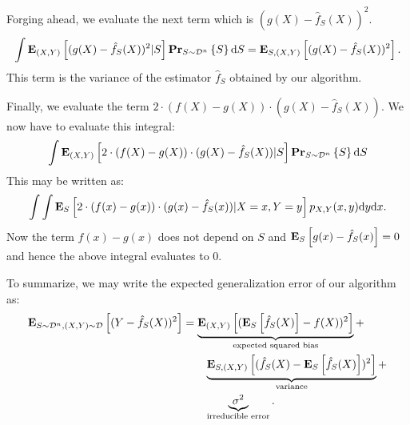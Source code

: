Forging ahead, we evaluate the next term which is $(g(X) - \hat{f}_S(X))^2$.  
\begin{equation}
    \int \mathbf{E}_{(X, Y)} \left [ (g(X) - \hat{f}_S(X))^2 \vert S \right ] \mathbf{Pr}_{S \sim \mathcal{D}^n} \left \{ S \right \} \text{d} S 
    = \mathbf{E}_{S, (X, Y)} \left [ (g(X) - \hat{f}_S(X))^2 \right ].
\end{equation}
This term is the variance of the estimator $\hat{f}_S$ obtained by our algorithm.

Finally, we evaluate the term $2 \cdot (f(X) - g(X)) \cdot (g(X) - \hat{f}_S(X))$. We now
have to evaluate this integral:
\begin{equation}
    \int \mathbf{E}_{(X, Y)} \left [ 2 \cdot (f(X) - g(X)) \cdot (g(X) - \hat{f}_S(X)) \vert S \right ] \mathbf{Pr}_{S \sim \mathcal{D}^n} \left \{ S \right \} \text{d} S
\end{equation}
This may be written as:
\begin{equation}
    \int \int \mathbf{E}_{S} \left [ 2 \cdot (f(x) - g(x)) \cdot (g(x) - \hat{f}_S(x)) \vert X = x, Y = y \right ] p_{X, Y}(x, y) \text{d} y \text{d} x.
\end{equation}  
Now the term $f(x) - g(x)$ does not depend on $S$ and $\mathbf{E}_{S} \left [ g(x) - \hat{f}_S(x) \right ] = 0$
and hence the above integral evaluates to $0$.

To summarize, we may write the expected generalization error of our algorithm 
as:
\begin{align*}
    \mathbf{E}_{S \sim \mathcal{D}^n, (X, Y) \sim \mathcal{D}} \left [ (Y - \hat{f}_S(X))^2 \right ] 
        & =  \underbrace{\mathbf{E}_{(X, Y)} \left [ (\mathbf{E}_{S} \left [ \hat{f}_S(X) \right ] - f(X) )^2 \right ]}_{\text{expected squared bias}} + \\
        & \quad \quad \underbrace{\mathbf{E}_{S, (X, Y)} \left [ ( \hat{f}_S(X) - \mathbf{E}_{S} \left [ \hat{f}_S(X) \right ] )^2 \right ]}_{\text{variance}} + \\
        & \quad \quad \underbrace{\sigma^2}_{\text{irreducible error}}.
\end{align*}
